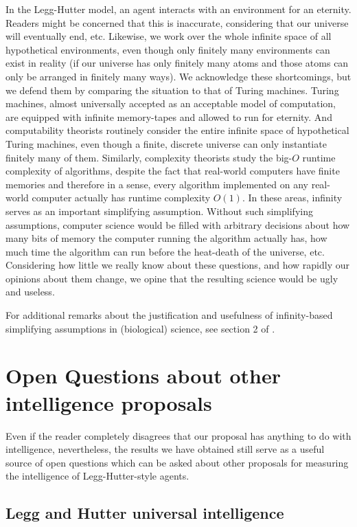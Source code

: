 \documentclass[twoside,11pt]{article}
\begin{document}
In the Legg-Hutter model, an agent interacts with an environment for an eternity.
Readers might be concerned that this is inaccurate, considering that our universe
will eventually end, etc. Likewise, we work over the whole infinite space of
all hypothetical environments, even though only finitely many environments can
exist in reality (if our universe has only finitely many atoms and those
atoms can only be arranged in finitely many ways). We acknowledge these shortcomings,
but we defend them by comparing the situation to that of Turing machines. Turing
machines, almost universally accepted as an acceptable model of computation, are
equipped with infinite memory-tapes and allowed to run for eternity. And
computability theorists routinely consider the entire infinite space of hypothetical
Turing machines, even though a finite, discrete universe can only
instantiate finitely many of them. Similarly, complexity theorists study
the big-$O$ runtime complexity of algorithms, despite the fact that real-world
computers have finite memories and therefore in a sense, every algorithm implemented
on any real-world computer actually has runtime complexity $O(1)$. In these areas,
infinity serves as an important simplifying assumption. Without such simplifying
assumptions, computer science would be filled with arbitrary decisions about
how many bits of memory the computer running the algorithm actually has, how much
time the algorithm can run before the heat-death of the universe, etc. Considering
how little we really know about these questions, and how rapidly our opinions about
them change, we opine that the resulting science would be ugly and useless.

For additional remarks about the justification and usefulness of infinity-based
simplifying assumptions in (biological) science, see section 2 of
\cite{alexander2013}.

\section{Open Questions about other intelligence proposals}

Even if the reader completely disagrees that our proposal has anything to do with
intelligence, nevertheless, the results we have obtained still serve as
a useful source of open questions which can be asked about other proposals for
measuring the intelligence of Legg-Hutter-style agents.

\subsection{Legg and Hutter universal intelligence}
\end{document}
